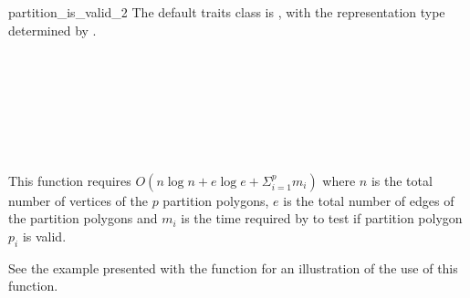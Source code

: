 \begin{ccRefFunction}{partition_is_valid_2}
The default traits class  is ,%
with the representation type determined by .

\ccSeeAlso

 \\
 \\
 \\
 \\
 \\
 \\

\ccImplementation

This function requires $O(n \log n + e \log e + \Sigma_{i=1}^p m_i)$ where $n$ 
is the total number of vertices of the $p$ partition polygons, $e$ is the 
total number of edges of the partition polygons and $m_i$ is the time required 
by  to test if partition polygon $p_i$ is valid.

\ccExample

See the example presented with the function 
for an illustration of the use of this function.

\end{ccRefFunction}
\renewcommand\ccRefPageBegin{\ccParDims\cgalColumnLayout}
\renewcommand\ccRefPageEnd{\ccParDims\cgalColumnLayout}
